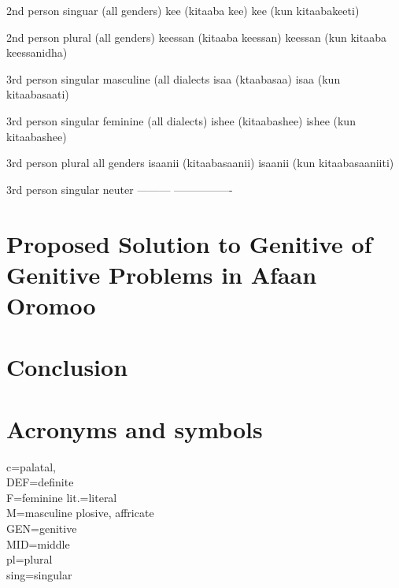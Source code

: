 \documentclass[11pt,a4paper]{article}
\begin{document}
	2nd person singuar
	(all genders)                   kee (kitaaba kee)                     kee (kun  kitaabakeeti)
	
	2nd person plural
	(all genders)                  keessan (kitaaba keessan)              keessan (kun kitaaba keessanidha)
	
	3rd person singular
	masculine
	(all dialects                 isaa (ktaabasaa)                        isaa (kun kitaabasaati)
	
	3rd person singular
	feminine
	(all dialects)             ishee (kitaabashee)                       ishee (kun kitaabashee)
	
	3rd person plural
	all genders               isaanii (kitaabasaanii)                    isaanii (kun kitaabasaaniiti)
	
	3rd person singular
	neuter                    ---------                                 ----------------
	
	\section{Proposed Solution to Genitive of Genitive Problems in Afaan Oromoo}
	
	
	\section{Conclusion}
	
	\newpage
	
	
	
	\newpage
	\section*{Acronyms and symbols}
	c=palatal,\\
	DEF=definite\\
	F=feminine
	lit.=literal\\
	M=masculine
	plosive, affricate\\
	GEN=genitive\\
	MID=middle\\
	pl=plural\\
	sing=singular\\
	
\end{document}

